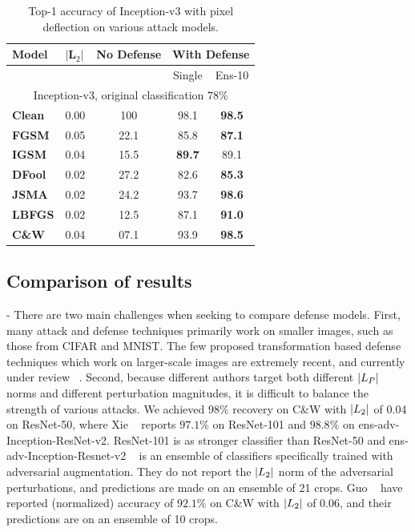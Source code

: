  
 \begin{table}[H]
\small
\centering
{}
\begin{tabular}{lcccc}
\textbf{Model} & \multicolumn{1}{l}{$|\boldsymbol{L}_2|$} & \multicolumn{1}{l}{\textbf{No Defense}} & \multicolumn{2}{l}{\textbf{With Defense}} \\ \hline
 & \multicolumn{1}{l}{} & \multicolumn{1}{l}{} & Single & Ens-10 \\ \cline{4-5} 
 \multicolumn{5}{c}{Inception-v3, original classification $78\%$} \\ \hline

\textbf{Clean} & 0.00 & 100 & 98.1 & \textbf{98.5} \\ \hline
\textbf{FGSM} & 0.05 & 22.1 & 85.8 & \textbf{87.1} \\
\textbf{IGSM} & 0.04 & 15.5 & \textbf{89.7} & 89.1 \\
\textbf{DFool} & 0.02 & 27.2 & 82.6 & \textbf{85.3} \\
\textbf{JSMA} & 0.02 & 24.2 & 93.7 & \textbf{98.6} \\
\textbf{LBFGS} & 0.02 & 12.5 & 87.1 & \textbf{91.0} \\
\textbf{C\&W} & 0.04 & 07.1 & 93.9 & \textbf{98.5} \\
\end{tabular}
\caption{Top-1 accuracy of Inception-v3 with pixel deflection on various attack models. 
 \label{tblmodels2}}
\end{table}

\subsection{Comparison of results} - 
There are two main challenges when seeking to compare defense models. 
First, many attack and defense techniques primarily work on smaller images, such as those from CIFAR and MNIST.
The few proposed transformation based defense techniques which work on larger-scale images are extremely recent, and currently under review ~\cite{MitigatingAnon208,CounteringAIGuo17}.
Second, because different authors target both different $|\boldmath{L}_P|$ norms and different perturbation magnitudes, it is difficult to balance the strength of various attacks.
We achieved $98\%$ recovery on C\&W with $|\boldmath{L}_2|$ of 0.04 on ResNet-50, where Xie \etal ~\cite{MitigatingAnon208} reports $97.1\%$ on ResNet-101 and $98.8\%$ on ens-adv-Inception-ResNet-v2.
ResNet-101 is as stronger classifier than ResNet-50 and ens-adv-Inception-Resnet-v2 ~\cite{Tramr2017EnsembleAT} is an ensemble of classifiers specifically trained with adversarial augmentation. 
They do not report the $|\boldmath{L}_2|$ norm of the adversarial perturbations, and predictions are made on an ensemble of 21 crops.
Guo \etal ~\cite{CounteringAIGuo17} have reported (normalized) accuracy of $92.1\%$ on C\&W with $|\boldmath{L}_2|$ of 0.06, and their predictions are on an ensemble of 10 crops.

